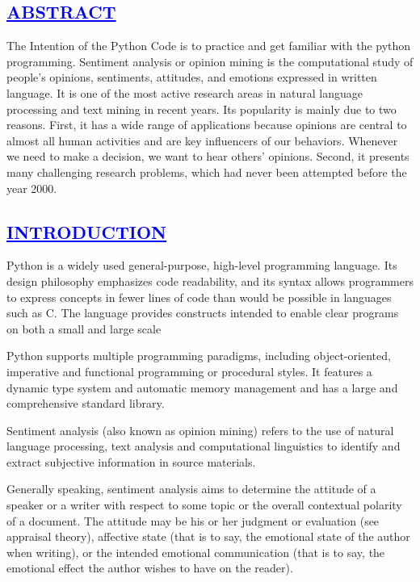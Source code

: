 \documentclass[a4paper,12pt]{report}
\begin{document}
\begin{center}
\chapter{\textcolor{blue}{\underline {ABSTRACT}}}
\end{center}
\noindent The Intention of the Python Code is to practice and get familiar with the python programming. Sentiment analysis or opinion mining is the computational study of people’s opinions,
sentiments, attitudes, and emotions expressed in written language. It is one of the most active research
areas in natural language processing and text mining in recent years. Its popularity is mainly due to two
reasons. First, it has a wide range of applications because opinions are central to almost all human
activities and are key influencers of our behaviors. Whenever we need to make a decision, we want to
hear others’ opinions. Second, it presents many challenging research problems, which had never been
attempted before the year 2000.
\begin{center}
\chapter{\textcolor{blue}{\underline {INTRODUCTION}}}
\end{center}
\noindent Python is a widely used general-purpose, high-level programming language. Its design philosophy 
emphasizes code readability, and its syntax allows programmers to express concepts in fewer lines of code than would 
be possible in languages such as C. The language provides constructs intended to enable clear programs on both
a small and large scale

Python supports multiple programming paradigms, including object-oriented, imperative and functional programming or 
procedural styles. It features a dynamic type system and automatic memory management and has a large and comprehensive
standard library.

Sentiment analysis (also known as opinion mining) refers to the use of natural language processing, text analysis and
computational linguistics to identify and extract subjective information in source materials.

Generally speaking, sentiment analysis aims to determine the attitude of a speaker or a writer with respect to some 
topic or the overall contextual polarity of a document. The attitude may be his or her judgment or evaluation 
(see appraisal theory), affective state (that is to say, the emotional state of the author when writing), or the 
intended emotional communication (that is to say, the emotional effect the author wishes to have on the reader).
\end{document}
